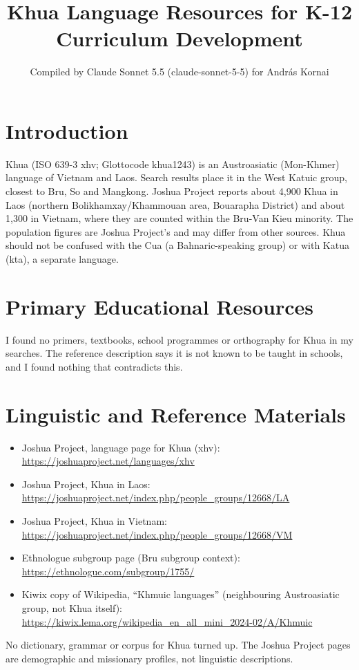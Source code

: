 \documentclass[12pt]{article}
\title{Khua Language Resources for K-12 Curriculum Development}
\author{Compiled by Claude Sonnet 5.5 (claude-sonnet-5-5) for Andr\'as Kornai}
\date{}
\begin{document}
\maketitle

\section{Introduction}
Khua (ISO 639-3 xhv; Glottocode khua1243) is an Austroasiatic (Mon-Khmer) language of Vietnam and Laos. Search results place it in the West Katuic group, closest to Bru, So and Mangkong. Joshua Project reports about 4,900 Khua in Laos (northern Bolikhamxay/Khammouan area, Bouarapha District) and about 1,300 in Vietnam, where they are counted within the Bru-Van Kieu minority. The population figures are Joshua Project's and may differ from other sources. Khua should not be confused with the Cua (a Bahnaric-speaking group) or with Katua (kta), a separate language.

\section{Primary Educational Resources}
I found no primers, textbooks, school programmes or orthography for Khua in my searches. The reference description says it is not known to be taught in schools, and I found nothing that contradicts this.

\section{Linguistic and Reference Materials}
\begin{itemize}
\item Joshua Project, language page for Khua (xhv): \url{https://joshuaproject.net/languages/xhv}
\item Joshua Project, Khua in Laos: \url{https://joshuaproject.net/index.php/people_groups/12668/LA}
\item Joshua Project, Khua in Vietnam: \url{https://joshuaproject.net/index.php/people_groups/12668/VM}
\item Ethnologue subgroup page (Bru subgroup context): \url{https://ethnologue.com/subgroup/1755/}
\item Kiwix copy of Wikipedia, ``Khmuic languages'' (neighbouring Austroasiatic group, not Khua itself): \url{https://kiwix.lema.org/wikipedia_en_all_mini_2024-02/A/Khmuic}
\end{itemize}
No dictionary, grammar or corpus for Khua turned up. The Joshua Project pages are demographic and missionary profiles, not linguistic descriptions.
\end{document}
